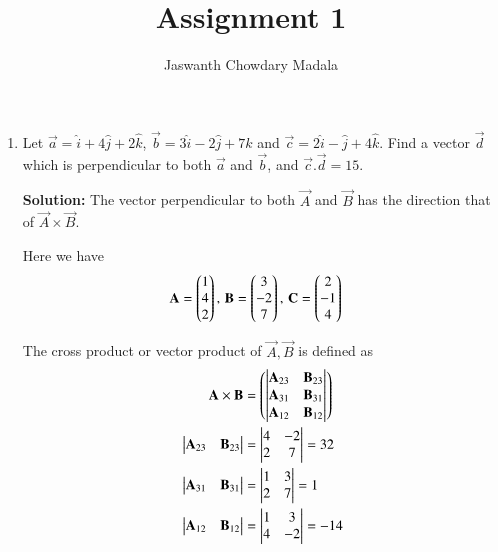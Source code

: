 \documentclass[journal,12pt,twocolumn]{IEEEtran}
\begin{document}
\vspace{3cm}


\title{Assignment 1}
\author{Jaswanth Chowdary Madala}





\maketitle

\newpage


\bigskip

\renewcommand{\thefigure}{\theenumi}
\renewcommand{\thetable}{\theenumi}

\begin{enumerate}
\item Let 	$\overrightarrow{a} = \hat{i}+4\hat{j}+2\hat{k}$, $\overrightarrow{b} = 3\hat{i}-2\hat{j}+7\hat{k}$ and 	$\overrightarrow{c} = 2\hat{i}-\hat{j}+4\hat{k}$. Find a vector $\overrightarrow{d}$ which is perpendicular to both $\overrightarrow{a}$ and $\overrightarrow{b}$, and $\overrightarrow{c}.\overrightarrow{d}=15$.

\textbf{Solution:} The vector perpendicular to both $\vec{A}$ and $\vec{B}$ has the direction that of $\vec{A} \times \vec{B}$.

Here we have
\begin{align} 
\mathbf{A}=\begin{pmatrix}1\\4\\2\end{pmatrix}, \, \mathbf{B}&=\begin{pmatrix}3\\-2\\7\end{pmatrix}, \,\mathbf{C}=\begin{pmatrix}2\\-1\\4\end{pmatrix}
\end{align}

The cross product or vector product of $\vec{A},\vec{B}$ is defined as
\begin{align}
\mathbf{A} \times \mathbf{B} &=
\begin{pmatrix}\begin{vmatrix}\mathbf{A}_{23}&\mathbf{B}_{23}\end{vmatrix}\\\begin{vmatrix}\mathbf{A}_{31}&\mathbf{B}_{31}\end{vmatrix}\\\begin{vmatrix}\mathbf{A}_{12}&\mathbf{B}_{12}\end{vmatrix}\end{pmatrix}\\
\begin{vmatrix}\mathbf{A}_{23}&\mathbf{B}_{23}\end{vmatrix}&=\begin{vmatrix}4&-2\\2&7\end{vmatrix} = 32\\
\begin{vmatrix}\mathbf{A}_{31}&\mathbf{B}_{31}\end{vmatrix}&=\begin{vmatrix}1&3\\2&7\end{vmatrix} = 1\\
\begin{vmatrix}\mathbf{A}_{12}&\mathbf{B}_{12}\end{vmatrix}&=\begin{vmatrix}1&3\\4&-2\end{vmatrix} = -14
\end{align}


\end{enumerate}
\end{document}
